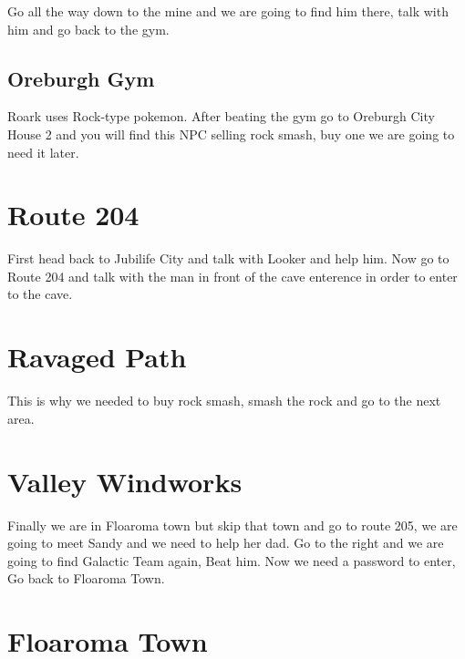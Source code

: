 \documentclass[11pt]{article}
\begin{document}
Go all the way down to the mine and we are going to find him there,
talk with him and go back to the gym.




\subsection{Oreburgh Gym}\label{subsec:oreburgh-gym}
Roark uses Rock-type pokemon.
After beating the gym go to Oreburgh City House 2 and you will find this NPC
selling rock smash, buy one we are going to need it later.

\section{Route 204}\label{sec:Route_204}

First head back to Jubilife City and talk with Looker and help him.
Now go to Route 204 and talk with the man in front of the cave enterence
in order to enter to the cave.




\section{Ravaged Path}\label{sec:Ravaged_Path}

This is why we needed to buy rock smash, smash the rock and go to the next area.




\section{Valley Windworks}\label{sec:valley-windworks}

Finally we are in Floaroma town but skip that town and go to route 205,
we are going to meet Sandy and we need to help her dad.
Go to the right and we are going to find Galactic Team again, Beat him.
Now we need a password to enter, Go back to Floaroma Town.




\section{Floaroma Town}\label{sec:floaroma-town}
\end{document}
